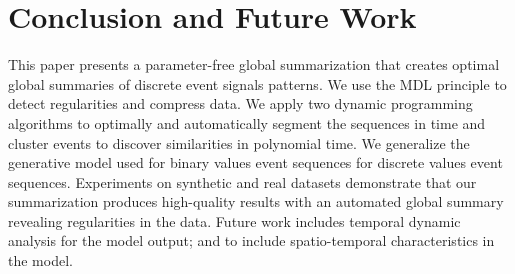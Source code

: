 \section{Conclusion and Future Work}

This paper presents a parameter-free global summarization that creates optimal global summaries of discrete event signals patterns. We use the MDL principle to detect regularities and compress data. We apply two dynamic programming algorithms to optimally and automatically segment the sequences in time and cluster events to discover similarities in polynomial time. We generalize the generative model used for binary values event sequences for discrete values event sequences. Experiments on synthetic and real datasets demonstrate that our summarization produces high-quality results with an automated global summary revealing regularities in the data. Future work includes temporal dynamic analysis for the model output; and to include spatio-temporal characteristics in the model.  

